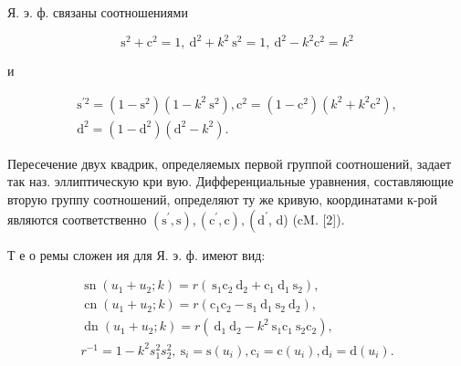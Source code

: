 \documentclass[10pt]{article}
\begin{document}
Я. э. ф. связаны соотношениями



\[

\mathrm{s}^{2}+\mathrm{c}^{2}=1, \mathrm{~d}^{2}+k^{2} \mathrm{~s}^{2}=1, \mathrm{~d}^{2}-k^{2} \mathrm{c}^{2}=k^{2}

\]



и



\[

\begin{gathered}

\mathrm{s}^{\prime 2}=\left(1-\mathrm{s}^{2}\right)\left(1-k^{2} \mathrm{~s}^{2}\right), \mathrm{c}^{2}=\left(1-\mathrm{c}^{2}\right)\left(k^{2}+k^{2} \mathrm{c}^{2}\right), \\

\mathrm{d}^{2}=\left(1-\mathrm{d}^{2}\right)\left(\mathrm{d}^{2}-k^{2}\right) .

\end{gathered}

\]



Пересечение двух квадрик, определяемых первой группой соотношений, задает так наз. эллиптическую кри вую. Дифференциальные уравнения, составляющие вторую группу соотношений, определяют ту же кривую, координатами к-рой являются соответственно $\left(\mathrm{s}^{\prime}, \mathrm{s}\right),\left(\mathrm{c}^{\prime}, \mathrm{c}\right),\left(\mathrm{d}^{\prime}\right.$, d) (cM. [2]).



Т е о ремы сложен ия для Я. э. ф. имеют вид:



\[

\begin{gathered}

\operatorname{sn}\left(u_{1}+u_{2} ; k\right)=r\left(\mathrm{~s}_{1} \mathrm{c}_{2} \mathrm{~d}_{2}+\mathrm{c}_{1} \mathrm{~d}_{1} \mathrm{~s}_{2}\right), \\

\operatorname{cn}\left(u_{1}+u_{2} ; k\right)=r\left(\mathrm{c}_{1} \mathrm{c}_{2}-\mathrm{s}_{1} \mathrm{~d}_{1} \mathrm{~s}_{2} \mathrm{~d}_{2}\right), \\

\operatorname{dn}\left(u_{1}+u_{2} ; k\right)=r\left(\mathrm{~d}_{1} \mathrm{~d}_{2}-k^{2} \mathrm{~s}_{1} \mathrm{c}_{1} \mathrm{~s}_{2} \mathrm{c}_{2}\right), \\

r^{-1}=1-k^{2} s_{1}^{2} s_{2}^{2}, \mathrm{~s}_{i}=\mathrm{s}\left(u_{i}\right), \mathrm{c}_{i}=\mathrm{c}\left(u_{i}\right), \mathrm{d}_{i}=\mathrm{d}\left(u_{i}\right) .

\end{gathered}

\]
\end{document}
